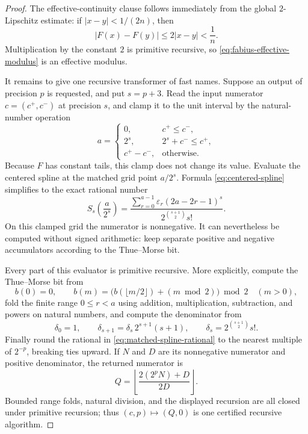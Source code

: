\documentclass[11pt,oneside]{article}
\theoremstyle{definition}
\theoremstyle{remark}
\begin{document}
\begin{proof}
The effective-continuity clause follows immediately from the global $2$-Lipschitz estimate:
if $|x-y|<1/(2n)$, then
\[
 |F(x)-F(y)|\le2|x-y|<\frac1n.
\]
Multiplication by the constant $2$ is primitive recursive, so
\eqref{eq:fabius-effective-modulus} is an effective modulus.

It remains to give one recursive transformer of fast names.  Suppose an output of precision
$p$ is requested, and put $s=p+3$.  Read the input numerator $c=(c^+,c^-)$ at precision
$s$, and clamp it to the unit interval by the natural-number operation
\begin{equation}
 a=
 \begin{cases}
 0,&c^+\le c^-,\\
 2^s,&2^s+c^-\le c^+,\\
 c^+-c^-,&\text{otherwise}.
 \end{cases}                                              \label{eq:primitive-clamp}
\end{equation}
Because $F$ has constant tails, this clamp does not change its value.  Evaluate the
centered spline at the matched grid point $a/2^s$.  Formula
\eqref{eq:centered-spline} simplifies to the exact rational number
\begin{equation}
 S_s\left(\frac a{2^s}\right)
 =
 \frac{\displaystyle
   \sum_{r=0}^{a-1}\varepsilon_r(2a-2r-1)^s}
 {2^{\binom{s+1}{2}}s!}.                                 \label{eq:matched-spline-rational}
\end{equation}
On this clamped grid the numerator is nonnegative.  It can nevertheless be computed without
signed arithmetic: keep separate positive and negative accumulators according to the
Thue--Morse bit.

Every part of this evaluator is primitive recursive.  More explicitly, compute the
Thue--Morse bit from
\begin{equation}
 b(0)=0,\qquad
 b(m)=\bigl(b(\lfloor m/2\rfloor)+(m\bmod2)\bigr)\bmod2
 \quad(m>0),                                              \label{eq:primitive-thue-bit}
\end{equation}
fold the finite range $0\le r<a$ using addition, multiplication, subtraction, and powers
on natural numbers, and compute the denominator from
\begin{equation}
 \delta_0=1,\qquad \delta_{s+1}=\delta_s\,2^{s+1}(s+1),
 \qquad \delta_s=2^{\binom{s+1}{2}}s!.                    \label{eq:spline-denominator-recursion}
\end{equation}
Finally round the rational in \eqref{eq:matched-spline-rational} to the nearest multiple
of $2^{-p}$, breaking ties upward.  If $N$ and $D$ are its nonnegative numerator and
positive denominator, the returned numerator is
\begin{equation}
 Q=\left\lfloor\frac{2(2^pN)+D}{2D}\right\rfloor.         \label{eq:half-up-rounding}
\end{equation}
Bounded range folds, natural division, and the displayed recursion are all closed under
primitive recursion; thus $(c,p)\mapsto(Q,0)$ is one certified recursive algorithm.


\end{proof}
\end{document}
